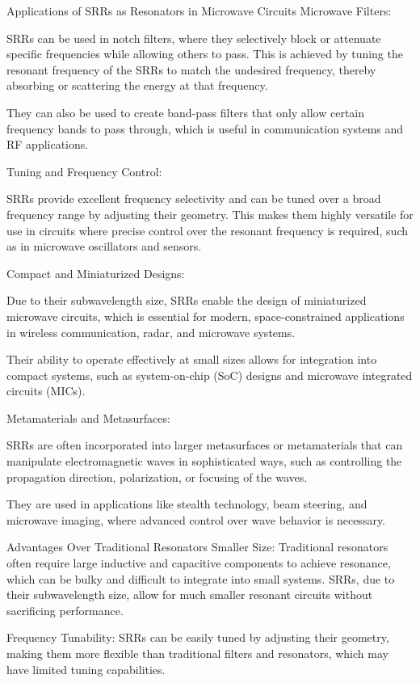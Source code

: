 \documentclass[conference]{IEEEtran}
\begin{document}
Applications of SRRs as Resonators in Microwave Circuits
Microwave Filters:

SRRs can be used in notch filters, where they selectively block or attenuate specific frequencies while allowing others to pass. This is achieved by tuning the resonant frequency of the SRRs to match the undesired frequency, thereby absorbing or scattering the energy at that frequency.

They can also be used to create band-pass filters that only allow certain frequency bands to pass through, which is useful in communication systems and RF applications.

Tuning and Frequency Control:

SRRs provide excellent frequency selectivity and can be tuned over a broad frequency range by adjusting their geometry. This makes them highly versatile for use in circuits where precise control over the resonant frequency is required, such as in microwave oscillators and sensors.

Compact and Miniaturized Designs:

Due to their subwavelength size, SRRs enable the design of miniaturized microwave circuits, which is essential for modern, space-constrained applications in wireless communication, radar, and microwave systems.

Their ability to operate effectively at small sizes allows for integration into compact systems, such as system-on-chip (SoC) designs and microwave integrated circuits (MICs).

Metamaterials and Metasurfaces:

SRRs are often incorporated into larger metasurfaces or metamaterials that can manipulate electromagnetic waves in sophisticated ways, such as controlling the propagation direction, polarization, or focusing of the waves.

They are used in applications like stealth technology, beam steering, and microwave imaging, where advanced control over wave behavior is necessary.

Advantages Over Traditional Resonators
Smaller Size: Traditional resonators often require large inductive and capacitive components to achieve resonance, which can be bulky and difficult to integrate into small systems. SRRs, due to their subwavelength size, allow for much smaller resonant circuits without sacrificing performance.

Frequency Tunability: SRRs can be easily tuned by adjusting their geometry, making them more flexible than traditional filters and resonators, which may have limited tuning capabilities.
\end{document}
